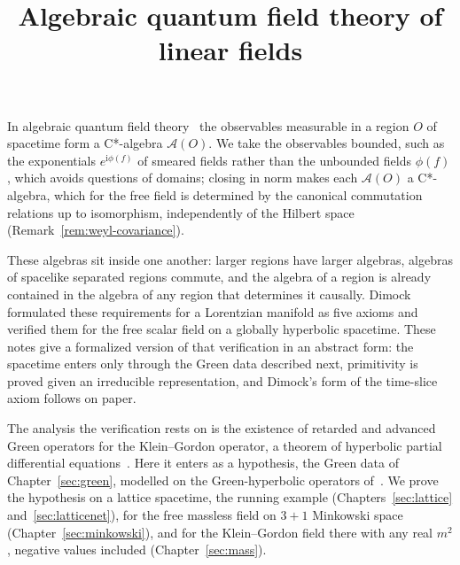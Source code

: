 \documentclass[11pt]{article}
\title{Algebraic quantum field theory of linear fields\dimockonly{\\[4pt]\large The axioms of Dimock for the free scalar field}}
\author{}
\date{}
\numberwithin{equation}{section}
\newcommand{\motiv}[1]{#1}
\newif\ifdimockedition
\newcommand{\extraonly}[1]{\ifdimockedition\else#1\fi}
\theoremstyle{definition}
\theoremstyle{remark}
\theoremstyle{plain}
\newcommand{\ii}{\mathrm i}
\newcommand{\cA}{\mathcal A}
\newcommand{\revc}[1]{#1}  %
\newcommand{\revd}[1]{#1}  %
\newcommand{\revm}[1]{#1}  %
\newcommand{\revo}[1]{#1}  %
\begin{document}
\AQFTEnableLinks
\sloppy
\maketitle
\vspace{-2em}
\noindent\motiv{In algebraic quantum field theory~\cite{haagkastler} the observables measurable in a region $O$
of spacetime form a C*-algebra $\cA(O)$. \revc{We take the observables bounded, such as the exponentials
$e^{\ii\phi(f)}$ of smeared fields rather than the unbounded fields $\phi(f)$, which avoids
questions of domains; closing in norm makes each $\cA(O)$ a C*-algebra\revd{, which for the free
field is determined by the canonical commutation relations up to isomorphism, independently of the
Hilbert space (Remark~\ref{rem:weyl-covariance})}.}}

\motiv{These algebras sit inside one another: larger regions have larger algebras, algebras of spacelike separated
regions commute, and the algebra of a region is already contained in the algebra of any
region that determines it causally. Dimock~\cite{dimock} formulated these requirements for a
Lorentzian manifold as five axioms and verified them for the free scalar field on a globally
hyperbolic spacetime. \revm{These notes give a formalized version of that verification} \revo{in an abstract form: the spacetime enters only through the Green data described next, primitivity is proved given an irreducible representation, and Dimock's form of the time-slice axiom follows on paper}\revm{.}}

\motiv{\revm{The analysis the verification rests on is the existence of retarded and advanced Green
operators for the Klein--Gordon operator, a theorem of hyperbolic partial differential
equations~\cite{bgp}. Here it enters as a hypothesis, the Green data of Chapter~\ref{sec:green},
modelled on the Green-hyperbolic operators of~\cite{baer-green}. We prove the hypothesis \extraonly{on a
lattice spacetime, the running example (Chapters~\ref{sec:lattice} and~\ref{sec:latticenet}), }for
the free massless field on $3+1$ Minkowski space (Chapter~\ref{sec:minkowski}), and for the
Klein--Gordon field there with any real $m^2$, negative values included (Chapter~\ref{sec:mass}).}}

{\small\tableofcontents}
\medskip
\end{document}
